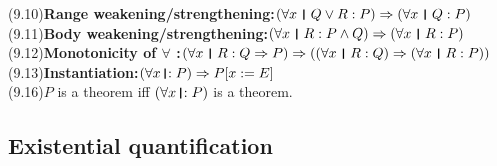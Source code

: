 \documentclass{amsart}
\newcommand{\lgap}{2pt}                             %
\newcommand{\impl}{\ensuremath{\Rightarrow}}        %
\newcommand{\thedr}{\rule[-.25ex]{.32mm}{1.75ex}}   %
\newcommand{\dr}{\;\,\thedr\,\;}                    %
\newcommand{\rb}{:}                                 %
\newcommand{\drrb}{\;\thedr\,{:}\;}                 %
\newcommand{\all}{\forall}                          %
\begin{document}
\begin{tabbing}
(9.10)\>\textbf{Range weakening/strengthening:}\quad $(\all x\dr Q\lor R\rb P)\impl (\all x\dr Q\rb P)$\\[\lgap]
(9.11)\>\textbf{Body weakening/strengthening:}\quad $(\all x\dr R\rb P\land Q)\impl (\all x\dr R\rb P)$\\[\lgap]
(9.12)\>\textbf{Monotonicity of $\all$ :}\quad $(\all x\dr R\rb Q\impl P)\impl ((\all x\dr R\rb Q)\impl (\all x\dr R\rb P))$\\[\lgap]
(9.13)\>\textbf{Instantiation:}\quad $(\all x\drrb P)\impl P[x:=E]$\\[\lgap]
(9.16)\>$P$ is a theorem iff $(\all x\drrb P)$ is a theorem.\\[\lgap]
\end{tabbing}

\subsection*{Existential quantification}
\end{document}
